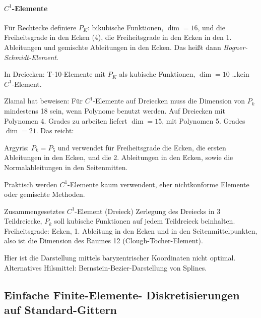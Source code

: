 \paragraph{$C^1$-Elemente}

Für Rechtecke definiere $P_K$: bikubische Funktionen, $\dim = 16$, und die Freiheitsgrade in den Ecken (4), die Freiheitsgrade in den Ecken in den 1. Ableitungen und gemischte Ableitungen in den Ecken. 
Das heißt dann \emph{Bogner-Schmidt-Element}.

In Dreiecken: T-10-Elemente mit $P_K$ als kubische Funktionen, $\dim = 10$ \dots kein $C^1$-Element.

Zlamal hat beweisen: Für $C^1$-Elemente auf Dreiecken muss die Dimension von $P_k$ mindestens 18 sein, wenn Polynome benutzt werden.
Auf Dreiecken mit Polynomen 4. Grades zu arbeiten liefert $\dim = 15$, mit Polynomen 5. Grades $\dim = 21$. Das reicht:

Argyris: $P_k = P_5$ und verwendet für Freiheitsgrade die Ecken, die ersten Ableitungen in den Ecken, und die 2. Ableitungen in den Ecken, sowie die Normalableitungen in den Seitenmitten.

Praktisch werden $C^1$-Elemente kaum verwendent, eher nichtkonforme Elemente oder gemischte Methoden.

\begin{beispiel} Zusammengesetztes $C^1$-Element (Dreieck)
Zerlegung des Dreiecks in 3 Teildreiecke, $P_k$ soll kubische Funktionen auf jedem Teildreieck beinhalten. Freiheitsgrade: Ecken, 1. Ableitung in den Ecken und in den Seitenmittelpunkten, also ist die Dimension des Raumes 12 (Clough-Tocher-Element).
\end{beispiel}

Hier ist die Darstellung mittels baryzentrischer Koordinaten nicht optimal. Alternatives Hilsmittel: Bernstein-Bezier-Darstellung von Splines.


\subsection{Einfache Finite-Elemente- Diskretisierungen auf Standard-Gittern}


